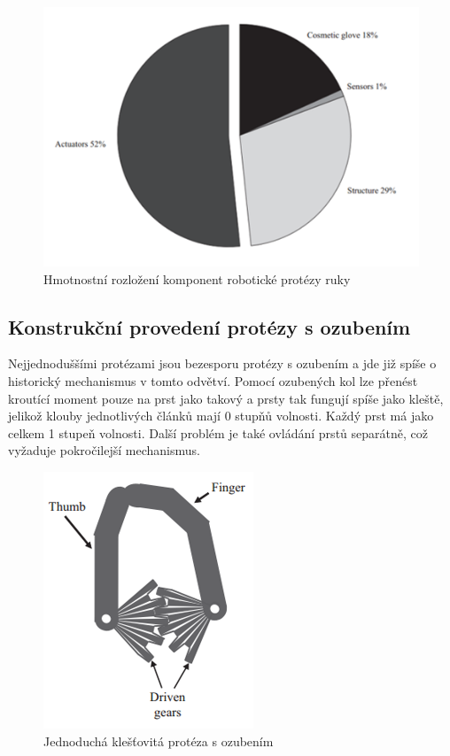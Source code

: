 \documentclass[a4paper,12pt]{article}
\begin{document}
\begin{figure}[hbtp]
\centering
\includegraphics[scale=0.8]{figures/Hmotnosti_casti_protezy.PNG}
\caption{Hmotnostní rozložení komponent robotické protézy ruky \cite{Chappell}}
\end{figure}

\subsection{Konstrukční provedení protézy s ozubením}
Nejjednoduššími protézami jsou bezesporu protézy s ozubením a jde již spíše o historický mechanismus v tomto odvětví. Pomocí ozubených kol lze přenést kroutící moment pouze na prst jako takový a prsty tak fungují spíše jako kleště, jelikož klouby jednotlivých článků mají 0 stupňů volnosti. Každý prst má jako celkem 1 stupeň volnosti. Další problém je také ovládání prstů separátně, což vyžaduje pokročilejší mechanismus.\cite{Chappell}
\pagebreak 

\begin{figure}[t!]
\centering
\includegraphics[scale=0.9]{figures/Clamp_fingers.PNG}
\caption{Jednoduchá klešťovitá protéza s ozubením \cite{Chappell}}
\end{figure}
\end{document}
